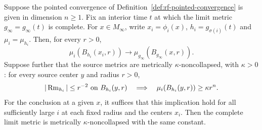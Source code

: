 \begin{lemma}
\label{lem:rf-limit-static-noncollapse}
Suppose the pointed convergence of
Definition~\ref{def:rf-pointed-convergence} is given in dimension
$n\geq1$.  Fix an interior time $t$ at which the limit metric
$g_\infty=g_\infty(t)$ is complete.  For $x\in M_\infty$,
write $x_i=\phi_i(x)$, $h_i=g_{\sigma(i)}(t)$ and
$\mu_i=\mu_{h_i}$.  Then, for every $r>0$,
\[
       \mu_i(B_{h_i}(x_i,r))
             \longrightarrow\mu_{g_\infty}(B_{g_\infty}(x,r)).
\]
Suppose further that the source metrics are metrically
$\kappa$-noncollapsed, with $\kappa>0$: for every source center
$y$ and radius $r>0$,
\[
 |\operatorname{Rm}_{h_i}|\leq r^{-2}\ \hbox{on }B_{h_i}(y,r)
       \quad\Longrightarrow\quad
       \mu_i(B_{h_i}(y,r))\geq\kappa r^n .
\]
For the conclusion at a given $x$, it suffices that this implication
hold for all sufficiently large $i$ at each fixed radius and
the centers $x_i$.
Then the complete limit metric is metrically
$\kappa$-noncollapsed with the same constant.
\end{lemma}
